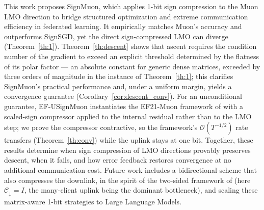 \documentclass{article}
\begin{document}

This work proposes SignMuon, which applies 1-bit sign compression to the Muon LMO direction to bridge structured optimization and extreme communication efficiency in federated learning. It empirically matches Muon's accuracy and outperforms SignSGD, yet the direct sign-compressed LMO can diverge (Theorem~\ref{th:1}). Theorem~\ref{th:descent} shows that ascent requires the condition number of the gradient to exceed an explicit threshold determined by the flatness of its polar factor --- an absolute constant for generic dense matrices, exceeded by three orders of magnitude in the instance of Theorem~\ref{th:1}; this clarifies SignMuon's practical performance and, under a uniform margin, yields a convergence guarantee (Corollary~\ref{cor:descent_conv}). For an unconditional guarantee, EF-USignMuon instantiates the EF21-Muon framework of \citet{gruntkowska2025error} with a scaled-sign compressor applied to the internal residual rather than to the LMO step; we prove the compressor contractive, so the framework's $\mathcal{O}(T^{-1/2})$ rate transfers (Theorem~\ref{th:conv}) while the uplink stays at one bit. Together, these results determine when sign compression of LMO directions provably preserves descent, when it fails, and how error feedback restores convergence at no additional communication cost. Future work includes a bidirectional scheme that also compresses the downlink, in the spirit of the two-sided framework of \citet{gruntkowska2025error} (here $\mathcal{C}_{\downarrow} = I$, the many-client uplink being the dominant bottleneck), and scaling these matrix-aware 1-bit strategies to Large Language Models.






\newpage




\newpage
\appendix
\end{document}
